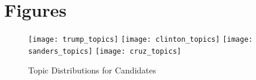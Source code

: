 \chapter{Figures}

\vspace*{-3in}

\begin{figure}[h!] 
\label{fig:topics}
\centering 
  \texttt{[image: trump\_topics]} 
  \texttt{[image: clinton\_topics]} 
  \texttt{[image: sanders\_topics]} 
  \texttt{[image: cruz\_topics]} 
  \caption{Topic Distributions for Candidates}
\end{figure}
\clearpage
\newpage
 